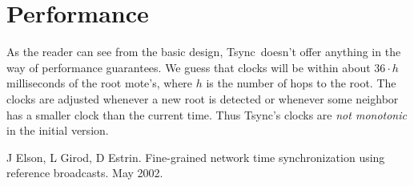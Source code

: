 \documentclass[11pt]{article}
\def\Tsync{\textsf{Tsync}}
\begin{document}
\section{Performance}

As the reader can see from the basic design, \Tsync\ doesn't
offer anything in the way of performance guarantees.  We 
guess that clocks will be within about $36\cdot h$ milliseconds
of the root mote's, where $h$ is the number of hops to the
root.  The clocks are adjusted whenever a new root is detected
or whenever some neighbor has a smaller clock than the current
time.  Thus \Tsync's clocks are \emph{not monotonic} in the
initial version.

\begin{thebibliography}{0}

 J Elson, L Girod, D Estrin.  Fine-grained
network time synchronization using reference broadcasts.  May 2002.

\end{thebibliography}
\end{document}
